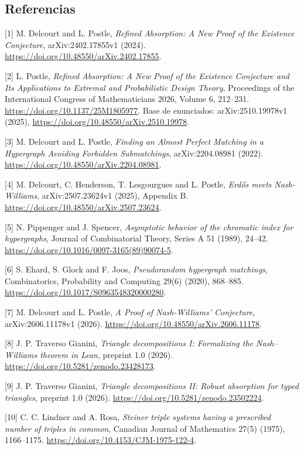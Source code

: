\documentclass[spanish,11pt,a4paper]{article}
\begin{document}
\subsection{Referencias}\label{referencias}

\begingroup\small\raggedright
\setlength{\parskip}{3pt}

{[}1{]} M. Delcourt and L. Postle, \emph{Refined Absorption: A New Proof of the Existence Conjecture}, arXiv:2402.17855v1 (2024). \url{https://doi.org/10.48550/arXiv.2402.17855}.

{[}2{]} L. Postle, \emph{Refined Absorption: A New Proof of the Existence Conjecture and Its Applications to Extremal and Probabilistic Design Theory}, Proceedings of the International Congress of Mathematicians 2026, Volume 6, 212--231. \url{https://doi.org/10.1137/25M1805977}. Base de enunciados: arXiv:2510.19978v1 (2025), \url{https://doi.org/10.48550/arXiv.2510.19978}.

{[}3{]} M. Delcourt and L. Postle, \emph{Finding an Almost Perfect Matching in a Hypergraph Avoiding Forbidden Submatchings}, arXiv:2204.08981 (2022). \url{https://doi.org/10.48550/arXiv.2204.08981}.

{[}4{]} M. Delcourt, C. Henderson, T. Lesgourgues and L. Postle, \emph{Erdős meets Nash-Williams}, arXiv:2507.23624v1 (2025), Appendix B. \url{https://doi.org/10.48550/arXiv.2507.23624}.

{[}5{]} N. Pippenger and J. Spencer, \emph{Asymptotic behavior of the chromatic index for hypergraphs}, Journal of Combinatorial Theory, Series A 51 (1989), 24--42. \url{https://doi.org/10.1016/0097-3165(89)90074-5}.

{[}6{]} S. Ehard, S. Glock and F. Joos, \emph{Pseudorandom hypergraph matchings}, Combinatorics, Probability and Computing 29(6) (2020), 868--885. \url{https://doi.org/10.1017/S0963548320000280}.

{[}7{]} M. Delcourt and L. Postle, \emph{A Proof of Nash-Williams' Conjecture}, arXiv:2606.11178v1 (2026). \url{https://doi.org/10.48550/arXiv.2606.11178}.

{[}8{]} J. P. Traverso Gianini, \emph{Triangle decompositions I: Formalizing the Nash--Williams theorem in Lean}, preprint 1.0 (2026). \url{https://doi.org/10.5281/zenodo.23428173}.

{[}9{]} J. P. Traverso Gianini, \emph{Triangle decompositions II: Robust absorption for typed triangles}, preprint 1.0 (2026). \url{https://doi.org/10.5281/zenodo.23502224}.

{[}10{]} C. C. Lindner and A. Rosa, \emph{Steiner triple systems having a prescribed number of triples in common}, Canadian Journal of Mathematics 27(5) (1975), 1166--1175. \url{https://doi.org/10.4153/CJM-1975-122-4}.
\end{document}
